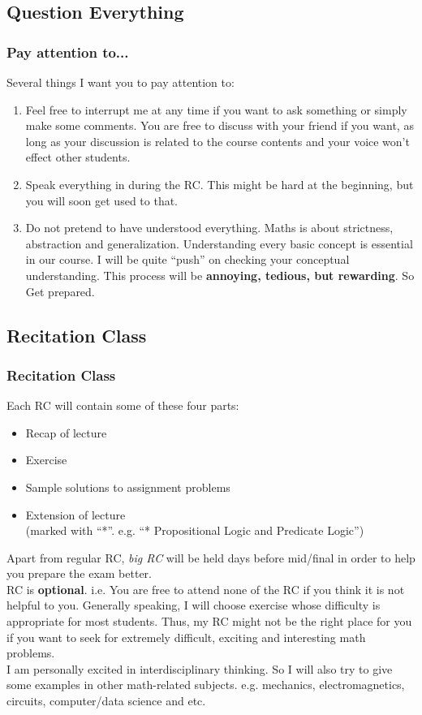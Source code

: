 \documentclass[10pt, t]{beamer}
\renewcommand{\emph}[1]{{\color{bladerunnerblue}\textsl{#1}}}
\newcommand{\alarm}[1]{{\color{bladerunnerred}{#1}}}
\newcommand{\nullspace}{~\\[15pt]}
\begin{document}
\subsection{Question Everything}
\begin{frame}
    \frametitle{Pay attention to...}
    Several things I want you to pay attention to:
    \begin{enumerate}
        \item \alarm{Be interactive.} Feel free to interrupt me at any time if you want to ask something or simply make some comments. You are free to discuss with your friend if you want, as long as your discussion is related to the course contents and your voice won't effect other students.
        \item Speak everything in \alarm{English} during the RC. This might be hard at the beginning, but you will soon get used to that.
        \item \alarm{``Question everything.''} Do not pretend to have understood everything. Maths is about strictness, abstraction and generalization. Understanding every basic concept is essential in our course. I will be quite ``push'' on checking your conceptual understanding. This process will be \textbf{annoying, tedious, but rewarding}. So Get prepared.
    \end{enumerate}
\end{frame}

\subsection{Recitation Class}
\begin{frame}
    \frametitle{Recitation Class}
    Each RC will contain some of these four parts:
    \begin{itemize}
        \item Recap of lecture
        \item Exercise
        \item Sample solutions to assignment problems
        \item Extension of lecture \\(marked with ``*''. e.g. ``* Propositional Logic and Predicate Logic'')
    \end{itemize}
    Apart from regular RC, \emph{big RC} will be held days before mid/final in order to help you prepare the exam better. \nullspace
    RC is \textbf{optional}. i.e. You are free to attend none of the RC if you think it is not helpful to you. Generally speaking, I will choose exercise whose difficulty is appropriate for most students. Thus, my RC might not be the right place for you if you want to seek for extremely difficult, exciting and interesting math problems. \nullspace
    I am personally excited in interdisciplinary thinking. So I will also try to give some examples in other math-related subjects. e.g. mechanics, electromagnetics, circuits, computer/data science and etc.
\end{frame}
\end{document}
